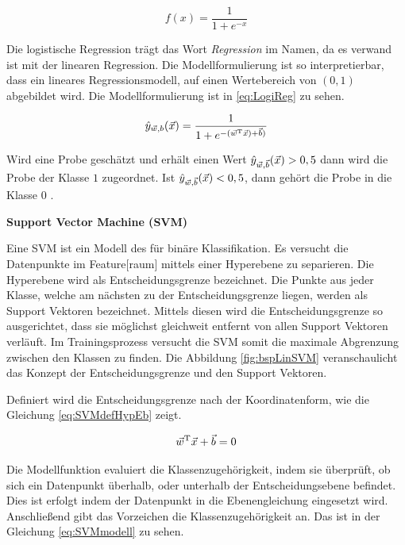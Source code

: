 \begin{equation}
f(x) = \frac{1}{1 + e^{-x}}
\label{eq:LogiFunc}
\end{equation}

Die logistische Regression trägt das Wort \textit{Regression} im Namen, da es verwand ist mit der linearen Regression. Die Modellformulierung ist so interpretierbar, dass ein lineares Regressionsmodell, auf einen Wertebereich von \((0,1)\) abgebildet wird. Die Modellformulierung ist in \ref{eq:LogiReg} zu sehen.

\begin{equation}
\hat{y}_{\vec{w},b}(\vec{x}) = \frac{1}{1 + e^{-(\vec{w}^\mathrm{T}\vec{x})+\vec{b})}}
\label{eq:LogiReg}
\end{equation}

Wird eine Probe geschätzt und erhält einen Wert \(\hat{y}_{\vec{w},\vec{b}}(\vec{x}) > 0,5\) dann wird die Probe der Klasse \(1\) zugeordnet. Ist \(\hat{y}_{\vec{w},\vec{b}}(\vec{x}) < 0,5\), dann gehört die Probe in die Klasse \(0\) \cite{Burkov.2019, Goodfellow.2016}.

\dubpar
\textbf{Support Vector Machine (\acrshort{SVM})} \par
Eine \acrshort{SVM} ist ein Modell des  für binäre \gls{Klassifikation}. Es versucht die Datenpunkte im \gls{Feature}[raum] mittels einer Hyperebene zu separieren. Die Hyperebene wird als Entscheidungsgrenze bezeichnet. Die Punkte aus jeder Klasse, welche am nächsten zu der Entscheidungsgrenze liegen, werden als Support Vektoren bezeichnet. Mittels diesen wird die Entscheidungsgrenze so ausgerichtet, dass sie möglichst gleichweit entfernt von allen Support Vektoren verläuft. Im Trainingsprozess versucht die \acrshort{SVM} somit die maximale Abgrenzung zwischen den Klassen zu finden. Die Abbildung \ref{fig:bspLinSVM} veranschaulicht das Konzept der Entscheidungsgrenze und den Support Vektoren. 


Definiert wird die Entscheidungsgrenze nach der Koordinatenform, wie die Gleichung \ref{eq:SVMdefHypEb} zeigt.

\begin{equation}
\vec{w}^\mathrm{T}\vec{x}+\vec{b}=0
\label{eq:SVMdefHypEb}
\end{equation}

Die Modellfunktion evaluiert die Klassenzugehörigkeit, indem sie überprüft, ob sich ein Datenpunkt überhalb, oder unterhalb der Entscheidungsebene befindet. Dies ist erfolgt indem der Datenpunkt in die Ebenengleichung eingesetzt wird. Anschließend gibt das Vorzeichen die Klassenzugehörigkeit an. Das ist in der Gleichung \ref{eq:SVMmodell} zu sehen. 


